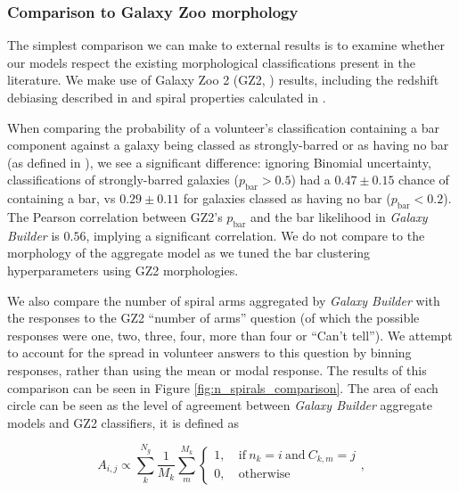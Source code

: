 \documentclass[../main.tex]{subfiles}
\begin{document}
\subsubsection{Comparison to Galaxy Zoo morphology}

The simplest comparison we can make to external results is to examine whether our models respect the existing morphological classifications present in the literature. We make use of Galaxy Zoo 2 (GZ2, \citealt{Willett2013:1308.3496v2}) results, including the redshift debiasing described in \citet{Hart2016:1607.01019v1} and spiral properties calculated in \citet{Hart2016:1607.01019v1}.

When comparing the probability of a volunteer's classification containing a bar component against a galaxy being classed as strongly-barred or as having no bar (as defined in \citealt{Masters2010:1003.0449v2}), we see a significant difference: ignoring Binomial uncertainty, classifications of strongly-barred galaxies ($p_\text{bar} > 0.5$) had a $0.47 \pm 0.15$ chance of containing a bar, vs $0.29 \pm 0.11$ for galaxies classed as having no bar ($p_\text{bar} < 0.2$). The Pearson correlation between GZ2's $p_\text{bar}$ and the bar likelihood in \textit{Galaxy Builder} is $0.56$, implying a significant correlation. We do not compare to the morphology of the aggregate model as we tuned the bar clustering hyperparameters using GZ2 morphologies.

We also compare the number of spiral arms aggregated by \textit{Galaxy Builder} with the responses to the GZ2 ``number of arms'' question (of which the possible responses were one, two, three, four, more than four or ``Can't tell''). We attempt to account for the spread in volunteer answers to this question by binning responses, rather than using the mean or modal response. The results of this comparison can be seen in Figure \ref{fig:n_spirals_comparison}. The area of each circle can be seen as the level of agreement between \textit{Galaxy Builder} aggregate models and GZ2 classifiers, it is defined as

\begin{equation}
  \label{eq:spiral_circle_area_size}
  A_{i, j} \propto \sum_{k}^{N_g}\frac{1}{M_k}\sum_{m}^{M_k}
  \begin{cases}
    1,&\ \mathrm{if}\ n_k = i\ \mathrm{and}\ C_{k, m} = j\\
    0,&\ \mathrm{otherwise}
  \end{cases},
\end{equation}
\end{document}
